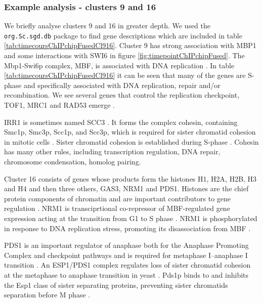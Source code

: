 \documentclass[]{article}
\begin{document}
\subsubsection{Example analysis - clusters 9 and 16}
We briefly analyse clusters 9 and 16 in greater depth. We used the \texttt{org.Sc.sgd.db} package to find gene descriptions which are included in table \ref{tab:timecoursChIPchipFusedCl916}. Cluster 9 has strong association with MBP1 and some interactions with SWI6 in figure \ref{fig:timepointChIPchipFused}. The Mbp1-Swi6p complex, MBF, is associated with DNA replication \citep{iyer2001genomic}. In table \ref{tab:timecoursChIPchipFusedCl916} it can be seen that many of the genes are S-phase and specifically associated with DNA replication, repair and/or recombination. We see several genes that control the replication checkpoint, TOF1, MRC1 and RAD53 emerge \citep{bando2009csm3, lao2018yeast}. 

IRR1 is sometimes named SCC3 \citep{toth1999yeast}. It forms the complex cohesin, containing Smc1p, Smc3p, Scc1p, and Scc3p, which is required for sister chromatid cohesion in mitotic cells \citep{klein1999central}. Sister chromatid cohesion is established during S-phase \citep{toth1999yeast}.
Cohesin has many other rules, including transcription regulation, DNA repair, chromosome condensation, homolog pairing\citep{mehta2013cohesin}.

Cluster 16 consists of genes whose products form the histones H1, H2A, H2B, H3 and H4 and then three others, GAS3, NRM1 and PDS1.  Histones are the chief protein components of chromatin \citep{fischle2003histone} and are important contributors to gene regulation \citep{bannister2011regulation}. NRM1 is transciprtional co-repressor of MBF-regulated gene expression acting at the transition from G1 to S phase \citep{de2006constraining, aligianni2009fission}. NRM1 is phosphorylated in response to DNA replication stress, promoting its disassociation from MBF \citep{de2008dna}. 

PDS1 is an important regulator of anaphase both for the Anaphase Promoting Complex and checkpoint pathways \citep{yamamoto1996pds1p, wang2001pds1} and is required for metaphase I–anaphase I transition \citep{cooper2009pds1p}. An ESP1/PDS1 complex regulates loss of sister chromatid cohesion at the metaphase to anaphase transition in yeast \citep{ciosk1998esp1}. Pds1p binds to and inhibits the Esp1 class of sister separating proteins, preventing sister chromatids separation before M phase \citep{ciosk1998esp1, toth1999yeast}.
\end{document}
